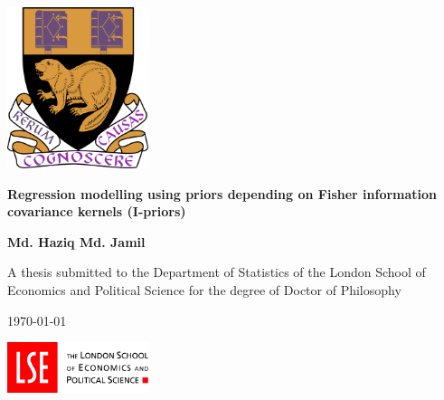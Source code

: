 \documentclass[11pt,twoside,openright,showframe]{report}
\begin{document}
\begin{titlepage}
  \singlespacing
  \begin{center}
    
    \vspace*{6.25mm}
     
    \includegraphics[width=0.31\textwidth]{figure/lse_coat_of_arms_1024}
    \vspace{15.2mm}
    
    \LARGE
    {\textbf{Regression modelling using priors depending on Fisher information covariance kernels (I-priors)}}
    \vspace{12.16mm}  %
    
    \Large 
    \textbf{Md. Haziq Md. Jamil}
    \vfill
    
    \normalsize
    A thesis submitted to the Department of Statistics of the London School of Economics and Political Science for the degree of Doctor of Philosophy
    \vspace{1cm}
    
    \UKvardate
    \today
    \vspace{1cm}
    
    \includegraphics[width=0.31\textwidth]{figure/lse_logo_1024}
  
  \end{center}
\end{titlepage}

%  
%  
\end{document}
